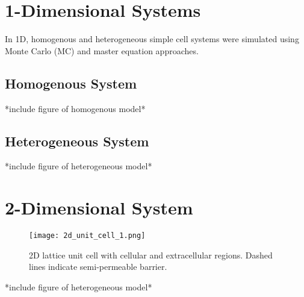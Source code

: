 \section{1-Dimensional Systems}
In 1D, homogenous and heterogeneous simple cell systems were simulated using Monte Carlo (MC) and master equation approaches. 

\subsection{Homogenous System}


*include figure of homogenous model*

\subsection{Heterogeneous System}


*include figure of heterogeneous model*

\section{2-Dimensional System}

\begin{figure}[h]
	\centering
	\texttt{[image: 2d\_unit\_cell\_1.png]}
	\caption{2D lattice unit cell with cellular and extracellular regions. Dashed lines indicate semi-permeable barrier.}
	\label{fig:2d_unit_cell_1.png}
\end{figure}
*include figure of heterogeneous model*